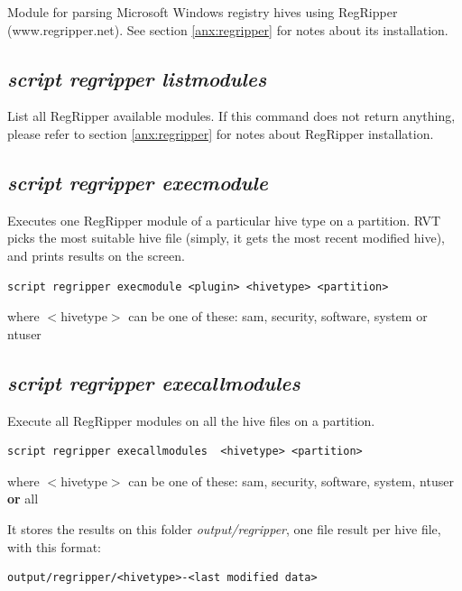 \documentclass[a4paper,11pt,oneside]{report}
\begin{document}
Module for parsing Microsoft Windows registry hives using RegRipper (www.regripper.net). See section \ref{anx:regripper} for notes about its installation.

\subsection{\emph{script regripper listmodules}}

List all RegRipper available modules. If this command does not return anything, please refer to section \ref{anx:regripper} for notes about RegRipper installation.



\subsection{\emph{script regripper execmodule}}

Executes one RegRipper module of a particular hive type on a partition. RVT picks the most suitable hive file (simply, it gets the most recent modified hive), and prints results on the screen.

\begin{verbatim}
script regripper execmodule <plugin> <hivetype> <partition>
\end{verbatim}

where $<$hivetype$>$ can be one of these: sam, security, software, system or ntuser



\subsection{\emph{script regripper execallmodules}}

Execute all RegRipper modules on all the hive files on a partition.

\begin{verbatim}
script regripper execallmodules  <hivetype> <partition>
\end{verbatim}

where $<$hivetype$>$ can be one of these: sam, security, software, system, ntuser  \textbf{or} all 

It stores the results on this folder \emph{output/regripper}, one file result per hive file, with this format:

\begin{verbatim}
output/regripper/<hivetype>-<last modified data>
\end{verbatim}
\end{document}
